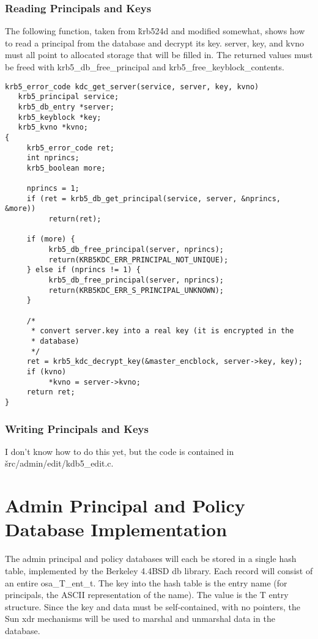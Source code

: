 \subsubsection{Reading Principals and Keys}

The following function, taken from \v{krb524d} and modified somewhat,
shows how to read a principal from the database and decrypt its key.
server, key, and kvno must all point to allocated storage that will be
filled in.  The returned values must be freed with
krb5_db_free_principal and krb5_free_keyblock_contents.

\begin{verbatim}
krb5_error_code kdc_get_server(service, server, key, kvno)
   krb5_principal service;
   krb5_db_entry *server;
   krb5_keyblock *key;
   krb5_kvno *kvno;
{
     krb5_error_code ret;
     int nprincs;
     krb5_boolean more;

     nprincs = 1;
     if (ret = krb5_db_get_principal(service, server, &nprincs, &more)) 
          return(ret);
     
     if (more) {
          krb5_db_free_principal(server, nprincs);
          return(KRB5KDC_ERR_PRINCIPAL_NOT_UNIQUE);
     } else if (nprincs != 1) {
          krb5_db_free_principal(server, nprincs);
          return(KRB5KDC_ERR_S_PRINCIPAL_UNKNOWN);
     }

     /*
      * convert server.key into a real key (it is encrypted in the
      * database)
      */
     ret = krb5_kdc_decrypt_key(&master_encblock, server->key, key);
     if (kvno)
          *kvno = server->kvno;
     return ret;
}
\end{verbatim}

\subsubsection{Writing Principals and Keys}

I don't know how to do this yet, but the code is contained in
\v{src/admin/edit/kdb5_edit.c}.

\section{Admin Principal and Policy Database Implementation}

The admin principal and policy databases will each be stored in a
single hash table, implemented by the Berkeley 4.4BSD db library.
Each record will consist of an entire osa_T_ent_t.  The key into the
hash table is the entry name (for principals, the ASCII representation
of the name).  The value is the T entry structure.  Since the key and
data must be self-contained, with no pointers, the Sun xdr mechanisms
will be used to marshal and unmarshal data in the database.

